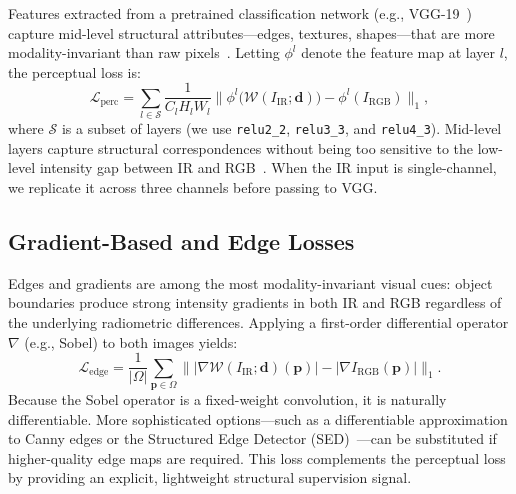 Features extracted from a pretrained classification network (e.g.,
VGG-19~\cite{simonyan2015vgg}) capture mid-level structural attributes---edges,
textures, shapes---that are more modality-invariant than raw
pixels~\cite{johnson2016perceptual}.  Letting $\phi^{l}$ denote the feature
map at layer $l$, the perceptual loss is:
%
\begin{equation}
  \mathcal{L}_{\text{perc}}
  = \sum_{l \in \mathcal{S}}
    \frac{1}{C_l H_l W_l}
    \bigl\lVert \phi^{l}\!\bigl(\mathcal{W}(I_{\text{IR}};\mathbf{d})\bigr)
              - \phi^{l}(I_{\text{RGB}}) \bigr\rVert_{1},
  \label{eq:perceptual}
\end{equation}
%
where $\mathcal{S}$ is a subset of layers (we use \texttt{relu2\_2},
\texttt{relu3\_3}, and \texttt{relu4\_3}).  Mid-level layers capture
structural correspondences without being too sensitive to the low-level
intensity gap between IR and RGB~\cite{zhang2018lpips}.  When the IR input is
single-channel, we replicate it across three channels before passing to VGG.

\subsection{Gradient-Based and Edge Losses}
\label{ssec:gradient}

Edges and gradients are among the most modality-invariant visual cues: object
boundaries produce strong intensity gradients in both IR and RGB regardless of
the underlying radiometric differences.  Applying a first-order differential
operator $\nabla$ (e.g., Sobel) to both images yields:
%
\begin{equation}
  \mathcal{L}_{\text{edge}}
  = \frac{1}{|\Omega|}\sum_{\mathbf{p}\in\Omega}
    \bigl\lVert |\nabla \mathcal{W}(I_{\text{IR}};\mathbf{d})(\mathbf{p})|
              - |\nabla I_{\text{RGB}}(\mathbf{p})| \bigr\rVert_{1}.
  \label{eq:edge}
\end{equation}
%
Because the Sobel operator is a fixed-weight convolution, it is naturally
differentiable.  More sophisticated options---such as a differentiable
approximation to Canny edges or the Structured Edge Detector
(SED)~\cite{dollar2013sed}---can be substituted if higher-quality edge maps
are required.  This loss complements the perceptual loss by providing an
explicit, lightweight structural supervision signal.


